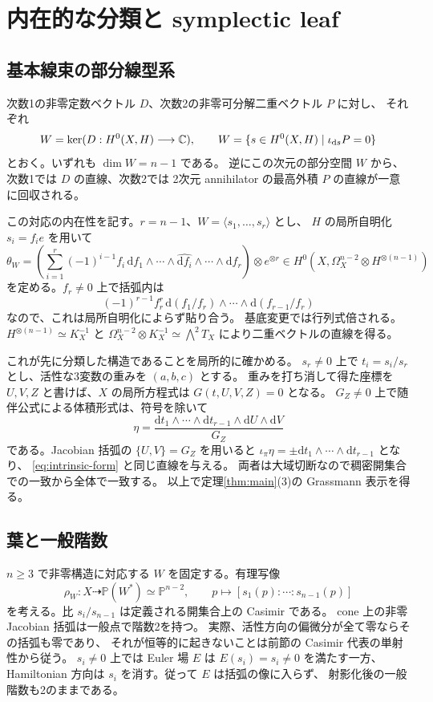\section{内在的な分類と symplectic leaf}
\label{sec:geometry}
\subsection{基本線束の部分線型系}
次数1の非零定数ベクトル $D$、次数2の非零可分解二重ベクトル $P$ に対し、
それぞれ
\[
 W=\ker(D:H^0(X,H)\longrightarrow\mathbb C),\qquad
 W=\{s\in H^0(X,H)\mid\iota_{\mathrm ds}P=0\}
\]
とおく。いずれも $\dim W=n-1$ である。
逆にこの次元の部分空間 $W$ から、次数1では $D$ の直線、次数2では
2次元 annihilator の最高外積 $P$ の直線が一意に回収される。

この対応の内在性を記す。$r=n-1$、$W=\langle s_1,\ldots,s_r\rangle$ とし、
$H$ の局所自明化 $s_i=f_ie$ を用いて
\begin{equation}
 \theta_W=\left(\sum_{i=1}^{r}(-1)^{i-1}f_i\,
 \mathrm df_1\wedge\cdots\wedge\widehat{\mathrm df_i}\wedge\cdots\wedge\mathrm df_r
 \right)\otimes e^{\otimes r}
 \in H^0(X,\Omega_X^{n-2}\otimes H^{\otimes(n-1)})
 \label{eq:intrinsic-form}
\end{equation}
を定める。$f_r\neq0$ 上で括弧内は
\[
 (-1)^{r-1}f_r^r\,
 \mathrm d(f_1/f_r)\wedge\cdots\wedge\mathrm d(f_{r-1}/f_r)
\]
なので、これは局所自明化によらず貼り合う。
基底変更では行列式倍される。
$H^{\otimes(n-1)}\simeq K_X^{-1}$ と
$\Omega_X^{n-2}\otimes K_X^{-1}\simeq\bigwedge^2T_X$ により二重ベクトルの直線を得る。

これが先に分類した構造であることを局所的に確かめる。
$s_r\neq0$ 上で $t_i=s_i/s_r$ とし、活性な3変数の重みを $(a,b,c)$ とする。
重みを打ち消して得た座標を $U,V,Z$ と書けば、$X$ の局所方程式は
$G(t,U,V,Z)=0$ となる。
$G_Z\neq0$ 上で随伴公式による体積形式は、符号を除いて
\[
 \eta=\frac{\mathrm dt_1\wedge\cdots\wedge\mathrm dt_{r-1}
                    \wedge\mathrm dU\wedge\mathrm dV}{G_Z}
\]
である。Jacobian 括弧の $\{U,V\}=G_Z$ を用いると
$\iota_\pi\eta=\pm\mathrm dt_1\wedge\cdots\wedge\mathrm dt_{r-1}$ となり、
\eqref{eq:intrinsic-form} と同じ直線を与える。
両者は大域切断なので稠密開集合での一致から全体で一致する。
以上で定理\ref{thm:main}(3)の Grassmann 表示を得る。

\subsection{葉と一般階数}
$n\geq3$ で非零構造に対応する $W$ を固定する。有理写像
\begin{equation}
 \rho_W:X\dashrightarrow\mathbb P(W^*)\simeq\mathbb P^{n-2},\qquad
 p\longmapsto[s_1(p):\cdots:s_{n-1}(p)]
 \label{eq:leaf-map}
\end{equation}
を考える。比 $s_i/s_{n-1}$ は定義される開集合上の Casimir である。
cone 上の非零 Jacobian 括弧は一般点で階数2を持つ。
実際、活性方向の偏微分が全て零ならその括弧も零であり、
それが恒等的に起きないことは前節の Casimir 代表の単射性から従う。
$s_i\neq0$ 上では Euler 場 $E$ は $E(s_i)=s_i\neq0$ を満たす一方、
Hamiltonian 方向は $s_i$ を消す。従って $E$ は括弧の像に入らず、
射影化後の一般階数も2のままである。

